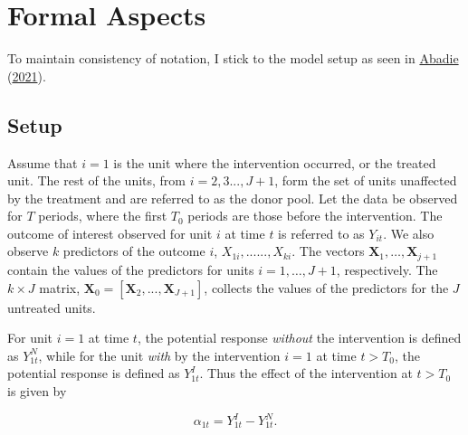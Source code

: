 \documentclass[12pt,nobind, a4paper]{reedthesis}
\begin{document}
 \hypertarget{fmr}{%
 \section{Formal Aspects}\label{fmr}}

 To maintain consistency of notation, I stick to the model setup as seen in \protect\hyperlink{ref-abadie_using_2021}{Abadie} (\protect\hyperlink{ref-abadie_using_2021}{2021}).

 \hypertarget{setup}{%
 \subsection{Setup}\label{setup}}

 Assume that \(i=1\) is the unit where the intervention occurred, or the treated unit. The rest of the units, from \(i=2,3...,J+1\), form the set of units unaffected by the treatment and are referred to as the donor pool. Let the data be observed for \(T\) periods, where the first \(T_0\) periods are those before the intervention. The outcome of interest observed for unit \(i\) at time \(t\) is referred to as \(Y_{it}\). We also observe \(k\) predictors of the outcome \(i\), \(X_{1i},......,X_{ki}\). The vectors \(\mathbf{X}_{1},…,\mathbf{X}_{j+1}\) contain the values of the predictors for units \(i = 1,…,J + 1\), respectively. The \(k \times J\) matrix, \(\mathbf{X}_{0} = [\mathbf{X}_{2},..., \mathbf{X}_{J+1}]\), collects the values of the predictors for the \(J\) untreated units.
 \linebreak

 For unit \(i=1\) at time \(t\), the potential response \emph{without} the intervention is defined as \(Y^{N}_{1t}\), while for the unit \emph{with} by the intervention \(i=1\) at time \(t>T_0\), the potential response is defined as \(Y^{I}_{1t}\). Thus the effect of the intervention at \(t>T_0\) is given by

 \[\alpha_{1t}= Y^{I}_{1t}-Y^{N}_{1t}.\]
\end{document}
